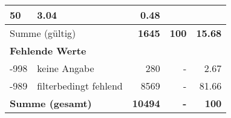 \begin{longtable}{lXrrr}
       \num{50} &
       \num[round-mode=places,round-precision=2]{3,04} &
         \num[round-mode=places,round-precision=2]{0,48} \\
     \midrule
     \multicolumn{2}{l}{Summe (gültig)} &
       \textbf{\num{1645}} &
     \textbf{100} &
       \textbf{\num[round-mode=places,round-precision=2]{15,68}} \\
     \multicolumn{5}{l}{\textbf{Fehlende Werte}}\\
       -998 &
       keine Angabe &
         \num{280} &
        - &
         \num[round-mode=places,round-precision=2]{2,67} \\
       -989 &
       filterbedingt fehlend &
         \num{8569} &
        - &
         \num[round-mode=places,round-precision=2]{81,66} \\
     \midrule
     \multicolumn{2}{l}{\textbf{Summe (gesamt)}} &
          \textbf{\num{10494}} &
        \textbf{-} &
        \textbf{100} \\
     \bottomrule
     \end{longtable}
     
